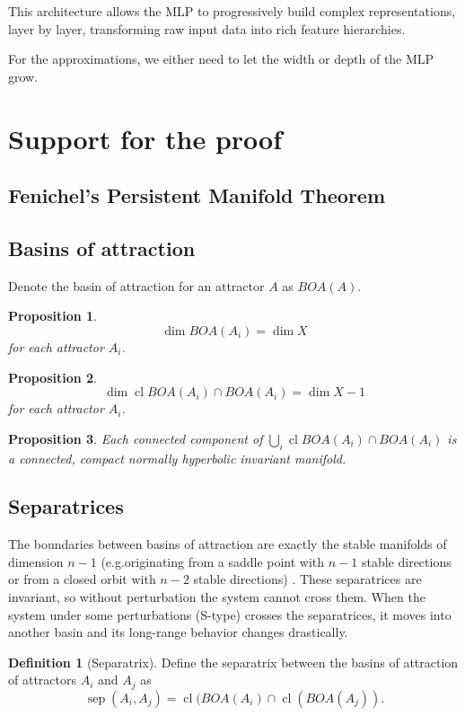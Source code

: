\documentclass{article}
\newtheorem{proposition}{Proposition}
\theoremstyle{definition}
\newtheorem{definition}{Definition}
\theoremstyle{remark}
\newcommand{\sep}{\operatorname{sep}}
\newcommand{\cl}{\operatorname{cl}}
\begin{document}
This architecture allows the MLP to progressively build complex representations, layer by layer, transforming raw input data into rich feature hierarchies.


For the approximations, we either need to let the width or depth of the MLP grow.

\section{Support for the proof}

\subsection{Fenichel's Persistent Manifold Theorem}


\subsection{Basins of attraction}
Denote the basin of attraction for an attractor $A$ as $BOA(A)$.

\begin{proposition}
\[\dim BOA(A_i) = \dim X\] for each attractor $A_i$.
\end{proposition}

\begin{proposition}
\[\dim\cl BOA(A_i) \cap BOA(A_i) = \dim X - 1 \] for each attractor $A_i$.
\end{proposition}

\begin{proposition}
Each connected component of $\bigcup_i\cl BOA(A_i) \cap BOA(A_i) $ is a connected, compact normally hyperbolic invariant manifold. %
\end{proposition}


\subsection{Separatrices}
The boundaries between basins of attraction are exactly the stable manifolds of dimension $n-1$ (e.g.originating from a saddle point with $n-1$ stable directions 
or from a closed orbit with $n-2$ stable directions) \citep{gruemm1975stable}.
These separatrices are invariant, so without  perturbation the system cannot cross them.
When the system under some perturbations (S-type) crosses the separatrices, it moves into another basin and its long-range behavior changes drastically.

\begin{definition}[Separatrix]\label{def:separatrix}
Define the separatrix between the basins of attraction of attractors $A_i$ and $A_j$ as 
\begin{equation}
\sep(A_i,A_j) = \cl(BOA(A_i)\cap \cl(BOA(A_j)).
\end{equation}
\end{definition}
\end{document}
